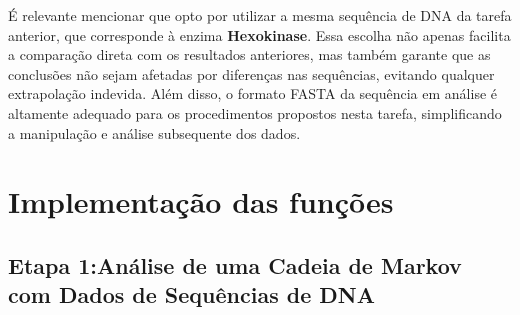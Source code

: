 \documentclass{article}
\begin{document}
É relevante mencionar que opto por utilizar a mesma sequência de DNA da tarefa anterior, que corresponde à enzima \textbf{Hexokinase}. Essa escolha não apenas facilita a comparação direta com os resultados anteriores, mas também garante que as conclusões não sejam afetadas por diferenças nas sequências, evitando qualquer extrapolação indevida. Além disso, o formato FASTA da sequência em análise é altamente adequado para os procedimentos propostos nesta tarefa, simplificando a manipulação e análise subsequente dos dados.


\section{Implementação das funções} 

\subsection{Etapa 1:Análise de uma Cadeia de Markov com Dados de Sequências de DNA}
\end{document}
